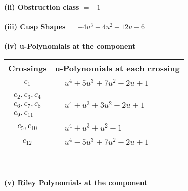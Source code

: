 \documentclass[1p]{elsarticle_modified}
\theoremstyle{definition}
\begin{document}
\flushleft \textbf{(ii) Obstruction class $= -1$}\\~\\
\flushleft \textbf{(iii) Cusp Shapes $= -4 u^3-4 u^2-12 u-6$}\\~\\
\newpage\renewcommand{\arraystretch}{1}
\flushleft \textbf{(iv) u-Polynomials at the component}\newline \\
\begin{tabular}{m{50pt}|m{274pt}}
Crossings & \hspace{64pt}u-Polynomials at each crossing \\
\hline $$\begin{aligned}c_{1}\end{aligned}$$&$\begin{aligned}
&u^4+5 u^3+7 u^2+2 u+1
\end{aligned}$\\
\hline $$\begin{aligned}c_{2},c_{3},c_{4}\\c_{6},c_{7},c_{8}\\c_{9},c_{11}\end{aligned}$$&$\begin{aligned}
&u^4+u^3+3 u^2+2 u+1
\end{aligned}$\\
\hline $$\begin{aligned}c_{5},c_{10}\end{aligned}$$&$\begin{aligned}
&u^4+u^3+u^2+1
\end{aligned}$\\
\hline $$\begin{aligned}c_{12}\end{aligned}$$&$\begin{aligned}
&u^4-5 u^3+7 u^2-2 u+1
\end{aligned}$\\
\hline
\end{tabular}\\~\\
\newpage\renewcommand{\arraystretch}{1}
\flushleft \textbf{(v) Riley Polynomials at the component}\newline \\
\end{document}
